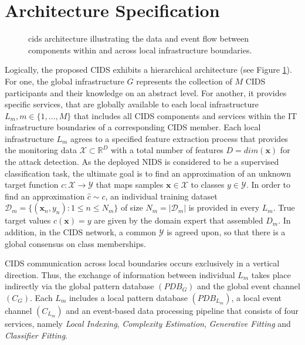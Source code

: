 \documentclass[../../main.tex]{subfiles}
\begin{document}
\section{Architecture Specification} \label{sec:architecture_specification}

\begin{figure}[b!]
    \centering
    
    \caption[Proposed \gls{cids} architecture]{\gls{cids} architecture illustrating the data and event flow between components within and across local infrastructure boundaries.}
    \label{fig:detailed_architecture}
    \end{figure}

    Logically, the proposed CIDS exhibits a hierarchical architecture (see Figure \ref{fig:detailed_architecture}). For one, the global infrastructure $G$ represents the collection of $M$ CIDS participants and their knowledge on an abstract level. For another, it provides specific services, that are globally available to each local infrastructure $L_m, m \in \{1, \dots, M\}$ that includes all CIDS components and services within the IT infrastructure boundaries of a corresponding CIDS member. Each local infrastructure $L_m$ agrees to a specified feature extraction process that provides the monitoring data $\mathcal{X} \subset \mathbb{R}^D$ with a total number of features $D = dim(\bm{x})$ for the attack detection. As the deployed NIDS is considered to be a supervised classification task, the ultimate goal is to find an approximation of an unknown target function $c: \mathcal{X} \rightarrow \mathcal{Y}$ that maps samples $\bm{x} \in \mathcal{X}$ to classes $y \in \mathcal{Y}$. In order to find an approximation $\hat{c} \sim c$, an individual training dataset $\mathcal{D}_m= \{(\bm{x}_n, y_n): 1 \leq n \leq N_m\}$ of size $N_m = |\mathcal{D}_m|$ is provided in every $L_m$. True target values $c(\bm{x}) = y$ are given by the domain expert that assembled $D_m$. In addition, in the CIDS network, a common $\mathcal{Y}$ is agreed upon, so that there is a global consensus on class memberships.
    
    CIDS communication across local boundaries occurs exclusively in a vertical direction. Thus, the exchange of information between individual $L_m$ takes place indirectly via the global pattern database $(PDB_G)$ and the global event channel $(C_G)$. Each $L_m$ includes a local pattern database $(PDB_{L_m})$, a local event channel $(C_{L_m})$ and an event-based data processing pipeline that consists of four services, namely \textit{Local Indexing}, \textit{Complexity Estimation}, \textit{Generative Fitting} and \textit{Classifier Fitting}. 
    
\end{document}
